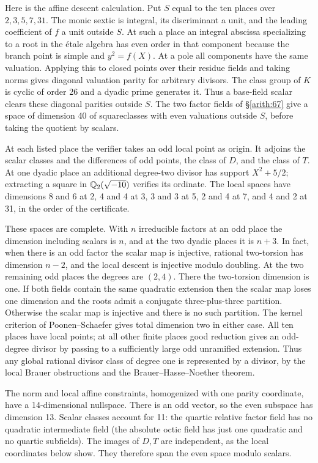 Here is the affine descent calculation. Put \(S\) equal to the ten
places over \(2,3,5,7,31\). The monic sextic is integral, its
discriminant a unit, and the leading coefficient of \(f\) a unit
outside \(S\). At such a place an integral abscissa specializing
to a root in the étale algebra has even order in that component
because the branch point is simple and \(y^2=f(X)\). At a pole all
components have the same valuation. Applying this to closed points
over their residue fields and taking norms gives diagonal valuation
parity for arbitrary divisors. The class group of \(K\) is cyclic
of order 26 and a dyadic prime generates it. Thus a base-field
scalar clears these diagonal parities outside \(S\). The two factor
fields of \S\ref{arith:67} give a space of dimension 40 of squareclasses with
even valuations outside \(S\), before taking the quotient by scalars.

At each listed place the verifier takes an odd local point as origin.
It adjoins the scalar classes and the differences of odd points, the
class of \(D\), and the class of \(T\). At one dyadic place an additional
degree-two divisor has support \(X^2+5/2\); extracting a square in
\(\mathbb Q_2(\sqrt{-10})\) verifies its ordinate. The local spaces
have dimensions 8 and 6 at 2, 4 and 4 at 3, 3 and 3 at 5, 2 and 4
at 7, and 4 and 2 at 31, in the order of the certificate.

These spaces are complete. With \(n\) irreducible factors at an odd
place the dimension including scalars is \(n\), and at the two dyadic
places it is \(n+3\). In fact, when there is an odd factor the scalar
map is injective, rational two-torsion has dimension \(n-2\), and
the local descent is injective modulo doubling. At the two remaining
odd places the degrees are \((2,4)\). There the two-torsion dimension
is one. If both fields contain the same quadratic extension then the
scalar map loses one dimension and the roots admit a conjugate
three-plus-three partition. Otherwise the scalar map is injective
and there is no such partition. The kernel criterion of
Poonen--Schaefer gives total dimension two in either case.
All ten places have local points; at all other finite places good
reduction gives an odd-degree divisor by passing to a sufficiently
large odd unramified extension. Thus any global rational divisor
class of degree one is represented by a divisor, by the local
Brauer obstructions and the Brauer--Hasse--Noether theorem.

The norm and local affine constraints, homogenized with one parity
coordinate, have a 14-dimensional nullspace. There is an odd vector,
so the even subspace has dimension 13. Scalar classes account for 11:
the quartic relative factor field has no quadratic intermediate field
(the absolute octic field has just one quadratic and no quartic
subfields). The images of \(D,T\) are independent, as the local
coordinates below show. They therefore span the even space modulo
scalars.

